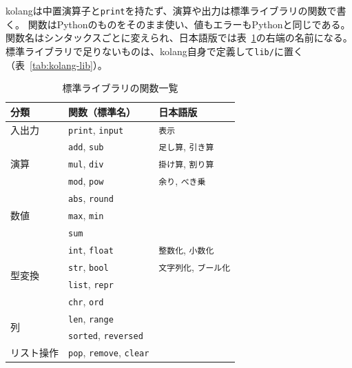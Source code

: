 \documentclass{ipsjprosym}
\begin{document}
kolangは中置演算子と\texttt{print}を持たず、演算や出力は標準ライブラリの関数で書く。
関数はPythonのものをそのまま使い、値もエラーもPythonと同じである。
関数名はシンタックスごとに変えられ、日本語版では表~\ref{tab:kolang-stdlib}の右端の名前になる。
標準ライブラリで足りないものは、kolang自身で定義して\texttt{lib/}に置く（表~\ref{tab:kolang-lib}）。

\begin{table}[t]
\centering
\caption{標準ライブラリの関数一覧}
\label{tab:kolang-stdlib}
\begin{small}
\setlength{\tabcolsep}{2pt}
\begin{tabular}{lll}
\toprule
分類 & 関数（標準名） & 日本語版 \\
\midrule
入出力     & \texttt{print}, \texttt{input} & \texttt{表示} \\
\midrule
\multirow{3}{*}{演算}
 & \texttt{add}, \texttt{sub}   & \texttt{足し算}, \texttt{引き算} \\
 & \texttt{mul}, \texttt{div}   & \texttt{掛け算}, \texttt{割り算} \\
 & \texttt{mod}, \texttt{pow}   & \texttt{余り}, \texttt{べき乗} \\
\midrule
\multirow{3}{*}{数値}
 & \texttt{abs}, \texttt{round} & \\
 & \texttt{max}, \texttt{min}   & \\
 & \texttt{sum}                 & \\
\midrule
\multirow{4}{*}{型変換}
 & \texttt{int}, \texttt{float} & \texttt{整数化}, \texttt{小数化} \\
 & \texttt{str}, \texttt{bool}  & \texttt{文字列化}, \texttt{ブール化} \\
 & \texttt{list}, \texttt{repr} & \\
 & \texttt{chr}, \texttt{ord} & \\
\midrule
\multirow{2}{*}{列}
 & \texttt{len}, \texttt{range} & \\
 & \texttt{sorted}, \texttt{reversed} & \\
\midrule
リスト操作 & \texttt{pop}, \texttt{remove}, \texttt{clear} & \\
\bottomrule
\end{tabular}
\end{small}
\end{table}
\end{document}
